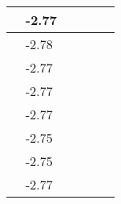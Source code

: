 \documentclass[a4paper,11pt]{report}
\begin{document}
\begin{table}[H]
\begin{center}
\begin{tabular}{|l|l|l|l|l|l|}
\hline
\hspace*{0.5cm}&\hspace*{0.5cm}-2.77&\hspace*{0.5cm}&\hspace*{0.5cm}&\hspace*{0.5cm}\\
\hline
\hspace*{0.5cm}&\hspace*{0.5cm}-2.78&\hspace*{0.5cm}&\hspace*{0.5cm}&\hspace*{0.5cm}\\
\hline
\hspace*{0.5cm}&\hspace*{0.5cm}-2.77&\hspace*{0.5cm}&\hspace*{0.5cm}&\hspace*{0.5cm}\\
\hline
\hspace*{0.5cm}&\hspace*{0.5cm}-2.77&\hspace*{0.5cm}&\hspace*{0.5cm}&\hspace*{0.5cm}\\
\hline
\hspace*{0.5cm}&\hspace*{0.5cm}-2.77&\hspace*{0.5cm}&\hspace*{0.5cm}&\hspace*{0.5cm}\\
\hline
\hspace*{0.5cm}&\hspace*{0.5cm}-2.75&\hspace*{0.5cm}&\hspace*{0.5cm}&\hspace*{0.5cm}\\
\hline
\hspace*{0.5cm}&\hspace*{0.5cm}-2.75&\hspace*{0.5cm}&\hspace*{0.5cm}&\hspace*{0.5cm}\\
\hline
\hspace*{0.5cm}&\hspace*{0.5cm}-2.77&\hspace*{0.5cm}&\hspace*{0.5cm}&\hspace*{0.5cm}\\

\end{tabular}
\end{center}
\end{table}
\end{document}
